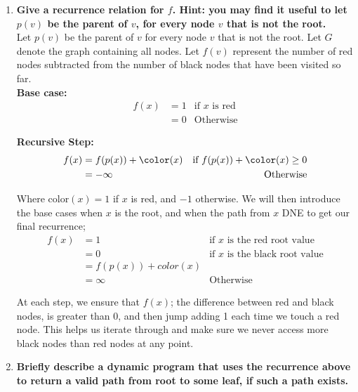 \documentclass{article}
\begin{document}
\begin{enumerate}
\begin{enumerate}

\item \textbf{Give a recurrence relation for $f$. Hint: you may find it useful to let $p(v)$ be the parent of $v$, for every node $v$ that is not the root.} \\

Let $p(v)$ be the parent of $v$ for every node $v$ that is not the root. Let $G$ denote the graph containing all nodes. Let $f(v)$ represent the number of red nodes subtracted from the number of black nodes that have been visited so far. \\
\newline 
\textbf{Base case: }
\begin{align*}
    f(x) & = 1 & \text{if $x$ is red} \\
    & = 0 & \text{Otherwise}
\end{align*}

\textbf{Recursive Step:}
\begin{align*}
    f(x) & = f(p(x)) + \color(x) & \text{if } f(p(x)) + \color(x) \geq 0 \\
    & = - \infty & \text{Otherwise}
\end{align*}

Where color$(x) = 1$ if $x$ is red, and $-1$ otherwise. We will then introduce the base cases when $x$ is the root, and when the path from $x$ DNE to get our final recurrence; 
\begin{align*}
    f(x) & = 1 & \text{if $x$ is the red root value} \\
    & = 0 & \text{if $x$ is the black root value} \\
    & = f(p(x)) + color(x) \\
    & = \infty & \text{Otherwise}
\end{align*}

At each step, we ensure that $f(x)$; the difference between red and black nodes, is greater than 0, and then jump adding 1 each time we touch a red node. This helps us iterate through and make sure we never access more black nodes than red nodes at any point. \\







\item \textbf{Briefly describe a dynamic program that uses the recurrence above to return a valid path from root to some leaf, if such a path exists.} \\


\end{enumerate}
\end{enumerate}
\end{document}
